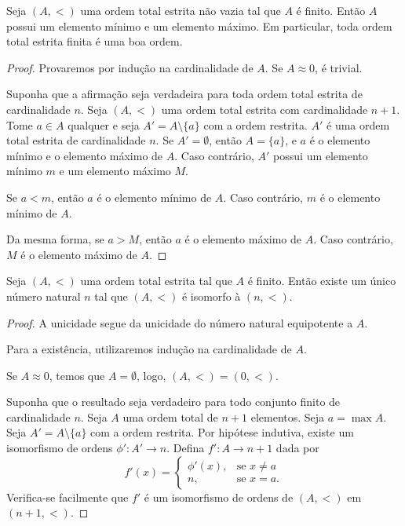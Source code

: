 \begin{lemma}[$Z^-$]\label{prop:finitoBoaOrdem}
    Seja $(A, <)$ uma ordem total estrita não vazia tal que $A$ é finito.
    Então $A$ possui um elemento mínimo e um elemento máximo.
    Em particular, toda ordem total estrita finita é uma boa ordem.
\end{lemma}
\begin{proof}
    Provaremos por indução na cardinalidade de $A$.
    Se $A\approx 0$, é trivial.

    Suponha que a afirmação seja verdadeira para toda ordem total estrita de cardinalidade $n$.
    Seja $(A, <)$ uma ordem total estrita com cardinalidade $n+1$.
    Tome $a\in A$ qualquer e seja $A' = A\setminus\{a\}$ com a ordem restrita.
    $A'$ é uma ordem total estrita de cardinalidade $n$.
    Se $A'=\emptyset$, então $A=\{a\}$, e $a$ é o elemento mínimo e o elemento máximo de $A$.
    Caso contrário, $A'$ possui um elemento mínimo $m$ e um elemento máximo $M$.
    
    Se $a<m$, então $a$ é o elemento mínimo de $A$.
    Caso contrário, $m$ é o elemento mínimo de $A$.

    Da mesma forma, se $a>M$, então $a$ é o elemento máximo de $A$.
    Caso contrário, $M$ é o elemento máximo de $A$.
\end{proof}

\begin{proposition}[$Z^-$]\label{prop:boaOrdemFinitaIsomorfaANatural}
    Seja $(A, <)$ uma ordem total estrita tal que $A$ é finito.
    Então existe um único número natural $n$ tal que $(A, <)$ é isomorfo à $(n, <)$.
\end{proposition}
\begin{proof}
A unicidade segue da unicidade do número natural equipotente a $A$.

Para a existência, utilizaremos indução na cardinalidade de $A$.

Se $A\approx 0$, temos que $A=\emptyset$, logo, $(A, <)=(0, <)$.

Suponha que o resultado seja verdadeiro para todo conjunto finito de cardinalidade $n$.
Seja $A$ uma ordem total de $n+1$ elementos.
Seja $a=\max A$.
Seja $A' = A\setminus\{a\}$ com a ordem restrita.
Por hipótese indutiva, existe um isomorfismo de ordens $\phi': A'\to n$.
Defina $f': A\to n+1$ dada por
\[
    f'(x) = \begin{cases}
        \phi'(x), & \text{se } x\neq a\\
        n, & \text{se } x=a.
    \end{cases}
\]
Verifica-se facilmente que $f'$ é um isomorfismo de ordens de $(A, <)$ em $(n+1, <)$.
\end{proof}


